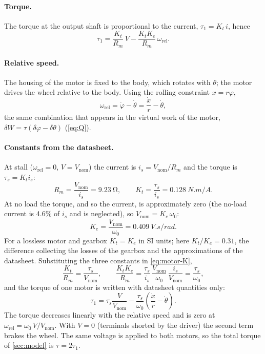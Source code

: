 \paragraph{Torque.} The torque at the output shaft is proportional to the
current, $\tau_1 = K_t\,i$, hence
\begin{equation}
  \tau_1 = \frac{K_t}{R_m}\,V - \frac{K_t K_e}{R_m}\,\omega_{\mathrm{rel}} .
  \label{eq:motor-K}
\end{equation}

\paragraph{Relative speed.} The housing of the motor is fixed to the body,
which rotates with $\theta$; the motor drives the wheel relative to the body.
Using the rolling constraint $x = r\varphi$,
\begin{equation}
  \omega_{\mathrm{rel}} = \dot\varphi - \dot\theta = \frac{\dot x}{r} - \dot\theta ,
\end{equation}
the same combination that appears in the virtual work of the motor,
$\delta W = \tau(\delta\varphi - \delta\theta)$ (\cref{eq:Q}).

\paragraph{Constants from the datasheet.} At stall ($\omega_{\mathrm{rel}} = 0$,
$V = V_{\mathrm{nom}}$) the current is $i_s = V_{\mathrm{nom}}/R_m$ and the
torque is $\tau_s = K_t i_s$:
\begin{equation}
  R_m = \frac{V_{\mathrm{nom}}}{i_s} = \SI{9.23}{\ohm} ,
  \qquad K_t = \frac{\tau_s}{i_s} = \SI{0.128}{N.m/A} .
\end{equation}
At no load the torque, and so the current, is approximately zero (the
no-load current is 4.6\% of $i_s$ and is neglected), so
$V_{\mathrm{nom}} = K_e\,\omega_0$:
\begin{equation}
  K_e = \frac{V_{\mathrm{nom}}}{\omega_0} = \SI{0.409}{V.s/rad} .
\end{equation}
For a lossless motor and gearbox $K_t = K_e$ in SI units; here
$K_t/K_e = 0.31$, the difference collecting the losses of the gearbox and the
approximations of the datasheet. Substituting the three constants in
\cref{eq:motor-K},
\begin{equation}
  \frac{K_t}{R_m} = \frac{\tau_s}{V_{\mathrm{nom}}} ,
  \qquad \frac{K_t K_e}{R_m} = \frac{\tau_s}{i_s}\,\frac{V_{\mathrm{nom}}}{\omega_0}\,\frac{i_s}{V_{\mathrm{nom}}}
  = \frac{\tau_s}{\omega_0} ,
\end{equation}
and the torque of one motor is written with datasheet quantities only:
\begin{equation}
  \tau_1 = \tau_s\frac{V}{V_{\mathrm{nom}}} - \frac{\tau_s}{\omega_0}\left(\frac{\dot x}{r} - \dot\theta\right) .
  \label{eq:motor}
\end{equation}
The torque decreases linearly with the relative speed and is zero at
$\omega_{\mathrm{rel}} = \omega_0\,V/V_{\mathrm{nom}}$. With $V = 0$ (terminals
shorted by the driver) the second term brakes the wheel. The same voltage is
applied to both motors, so the total torque of \cref{sec:model} is
$\tau = 2\tau_1$.

